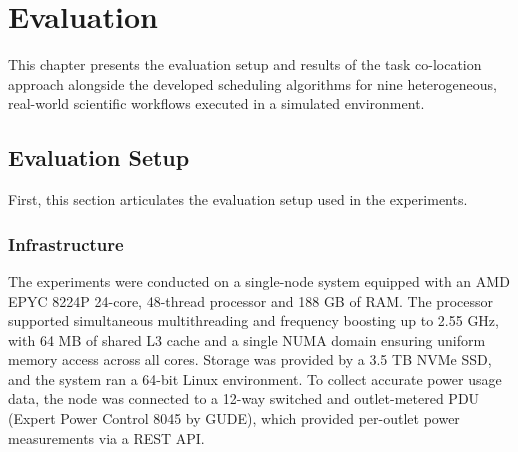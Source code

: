 \section{Evaluation}
\label{cha:evaluation}
This chapter presents the evaluation setup and results of the task co-location approach alongside the developed scheduling algorithms for nine heterogeneous, real-world scientific workflows executed in a simulated environment.
\subsection{Evaluation Setup}
\label{sec:evaluation_setup}
First, this section articulates the evaluation setup used in the experiments.

\subsubsection{Infrastructure}
\label{sec:evaluation_infrastructure}
The experiments were conducted on a single-node system equipped with an AMD EPYC 8224P 24-core, 48-thread processor and 188 GB of RAM. The processor supported simultaneous multithreading and frequency boosting up to 2.55 GHz, with 64 MB of shared L3 cache and a single NUMA domain ensuring uniform memory access across all cores. Storage was provided by a 3.5 TB NVMe SSD, and the system ran a 64-bit Linux environment.
To collect accurate power usage data, the node was connected to a 12-way switched and outlet-metered PDU (Expert Power Control 8045 by GUDE), which provided per-outlet power measurements via a REST API.

